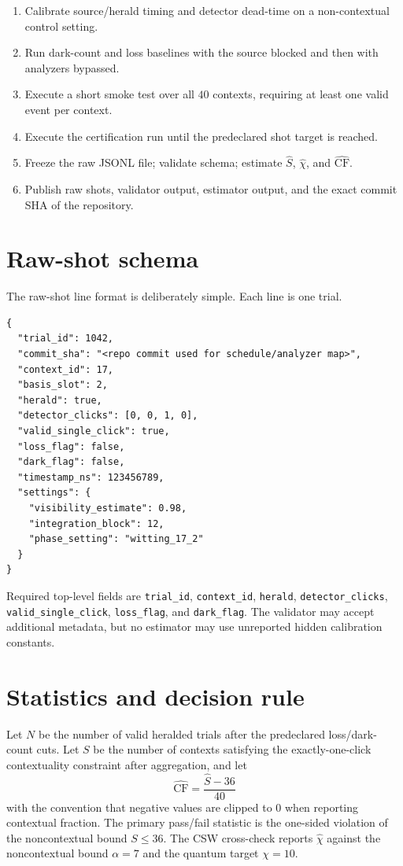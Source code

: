 \documentclass[11pt]{article}
\begin{document}
\begin{enumerate}[leftmargin=1.4em]
\item Calibrate source/herald timing and detector dead-time on a non-contextual control setting.
\item Run dark-count and loss baselines with the source blocked and then with analyzers bypassed.
\item Execute a short smoke test over all $40$ contexts, requiring at least one valid event per context.
\item Execute the certification run until the predeclared shot target is reached.
\item Freeze the raw JSONL file; validate schema; estimate $\widehat{S}$, $\widehat{\chi}$, and $\widehat{\mathrm{CF}}$.
\item Publish raw shots, validator output, estimator output, and the exact commit SHA of the repository.
\end{enumerate}

\section{Raw-shot schema}
The raw-shot line format is deliberately simple.  Each line is one trial.
\begin{verbatim}
{
  "trial_id": 1042,
  "commit_sha": "<repo commit used for schedule/analyzer map>",
  "context_id": 17,
  "basis_slot": 2,
  "herald": true,
  "detector_clicks": [0, 0, 1, 0],
  "valid_single_click": true,
  "loss_flag": false,
  "dark_flag": false,
  "timestamp_ns": 123456789,
  "settings": {
    "visibility_estimate": 0.98,
    "integration_block": 12,
    "phase_setting": "witting_17_2"
  }
}
\end{verbatim}

Required top-level fields are \texttt{trial\_id}, \texttt{context\_id}, \texttt{herald},
\texttt{detector\_clicks}, \texttt{valid\_single\_click}, \texttt{loss\_flag}, and \texttt{dark\_flag}.  The
validator may accept additional metadata, but no estimator may use unreported hidden calibration constants.

\section{Statistics and decision rule}
Let $N$ be the number of valid heralded trials after the predeclared loss/dark-count cuts.  Let $S$ be the
number of contexts satisfying the exactly-one-click contextuality constraint after aggregation, and let
\[
  \widehat{\mathrm{CF}}=\frac{\widehat{S}-36}{40}
\]
with the convention that negative values are clipped to $0$ when reporting contextual fraction.  The
primary pass/fail statistic is the one-sided violation of the noncontextual bound $S\le36$.  The CSW
cross-check reports $\widehat\chi$ against the noncontextual bound $\alpha=7$ and the quantum target
$\chi=10$.
\end{document}
